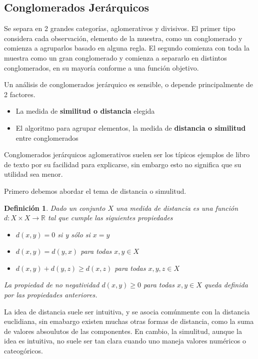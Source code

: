 \documentclass[12pt,oneside]{book}
\newtheorem*{defn}{Definici\'on}
\newcommand{\Reales}{{\mathbb{R}}}
\begin{document}
\subsection{Conglomerados Jer\'arquicos} %
\label{sub:conglomerados_jerarquicos}
Se separa en 2 grandes categor\'ias, aglomerativos y divisivos. El primer tipo considera cada observaci\'on, elemento de la muestra, como un conglomerado y comienza a agruparlos basado en alguna regla. El segundo comienza con toda la muestra como un gran conglomerado y comienza a separarlo en distintos conglomerados, en su mayor\'ia conforme a una funci\'on objetivo. 

Un an\'alisis de conglomerados jer\'arquico es sensible, o depende principalmente de 2 factores.
\begin{itemize}
	\item La medida de \textbf{similitud o distancia} elegida
	\item El algoritmo para agrupar elementos, la medida de \textbf{distancia o similitud} entre conglomerados
\end{itemize}

Conglomerados jer\'arquicos aglomerativos suelen ser los t\'ipicos ejemplos de libro de texto por su facilidad para explicarse, sin embargo esto no significa que su utilidad sea menor.

Primero debemos abordar el tema de distancia o simulitud. 
\begin{defn}\normalfont
	Dado un conjunto $X$ una medida de distancia es una funci\'on $d:X\times X\rightarrow\Reales$ tal que cumple las siguientes propiedades
	\begin{itemize}
		\item $d(x, y) = 0$ si y s\'olo si $x = y$
		\item $d(x, y) = d(y,x)$ para todas $x, y \in X$
		\item $d(x, y) + d(y, z) \geq d(x, z)$ para todas $x, y, z \in X$
	\end{itemize}
	La propiedad de no negatividad $d(x, y) \geq 0$ para todas $x, y \in X$ queda definida por las propiedades anteriores.
\end{defn}

La idea de distancia suele ser intuitiva, y se asocia com\'unmente con la distancia euclidiana, sin emabargo existen muchas otras formas de distancia, como la suma de valores absoulutos de las componentes. En cambio, la simulitud, aunque la idea es intuitiva, no suele ser tan clara cuando uno maneja valores num\'ericos o cateog\'oricos.\\
\end{document}

